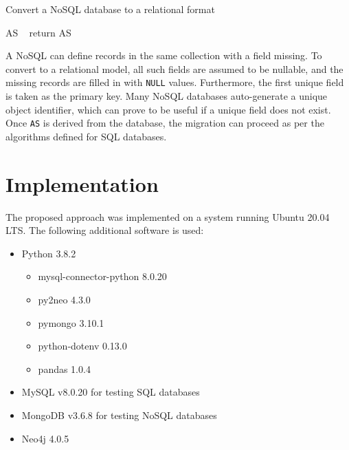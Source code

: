 \documentclass[12pt]{article}
\newcommand{\sectionfontstyle}{\fontsize{16pt}{1em}\usefont{T1}{phv}{b}{n}}
\begin{document}
    \begin{algorithm}[htb!]
        \SetAlgoLined
        \caption{Convert a NoSQL database to a relational format}
        AS \gets\ \phi{}
        return AS\;
        \label{algo:nosql_conversion}
    \end{algorithm}

    A NoSQL can define records in the same collection with a field missing. To convert to a relational model, all such fields are assumed to be nullable, and the missing records are filled in with \verb|NULL| values. Furthermore, the first unique field is taken as the primary key. Many NoSQL databases auto-generate a unique object identifier, which can prove to be useful if a unique field does not exist. Once \verb|AS| is derived from the database, the migration can proceed as per the algorithms defined for SQL databases.

    \clearpage

    \section{\sectionfontstyle Implementation}
    \label{sec:impl}
    The proposed approach was implemented on a system running Ubuntu 20.04 LTS. The following additional software is used:
    \begin{itemize}
        \item Python 3.8.2
        \begin{itemize}
            \item mysql-connector-python 8.0.20
            \item py2neo 4.3.0
            \item pymongo 3.10.1
            \item python-dotenv 0.13.0
            \item pandas 1.0.4
        \end{itemize}
        \item MySQL v8.0.20 for testing SQL databases
        \item MongoDB v3.6.8 for testing NoSQL databases
        \item Neo4j 4.0.5
    \end{itemize}
\end{document}
